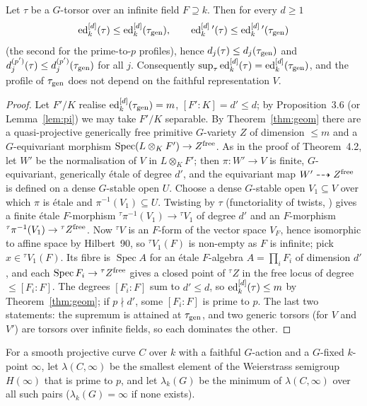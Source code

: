 \begin{proposition}\label{prop:vers}
Let $\tau$ be a $G$-torsor over an infinite field $F\supseteq k$. Then for every $d\ge1$
\[
\operatorname{ed}^{[d]}_k(\tau)\le\operatorname{ed}^{[d]}_k(\tau_{\mathrm{gen}}),\qquad
\operatorname{ed}^{[d]}_k{}'(\tau)\le\operatorname{ed}^{[d]}_k{}'(\tau_{\mathrm{gen}})
\]
(the second for the prime-to-$p$ profiles), hence $d_j(\tau)\le d_j(\tau_{\mathrm{gen}})$ and
$d_j^{(p')}(\tau)\le d_j^{(p')}(\tau_{\mathrm{gen}})$ for all $j$. Consequently
$\sup_\tau\operatorname{ed}^{[d]}_k(\tau)=\operatorname{ed}^{[d]}_k(\tau_{\mathrm{gen}})$, and the profile of $\tau_{\mathrm{gen}}$ does not
depend on the faithful representation $V$. 
\end{proposition}

\begin{proof}
Let $F'/K$ realise $\operatorname{ed}^{[d]}_k(\tau_{\mathrm{gen}})=m$, $[F':K]=d'\le d$; by Proposition~3.6 (or
Lemma~\ref{lem:pi}) we may take $F'/K$ separable. By Theorem~\ref{thm:geom} there are a
quasi-projective generically free primitive $G$-variety $Z$ of dimension $\le m$ and a
$G$-equivariant morphism $\operatorname{Spec}(L\otimes_KF')\to Z^{\rm free}$. As in the
proof of Theorem~4.2, let $W'$ be the normalisation of $V$ in $L\otimes_KF'$; then
$\pi\colon W'\to V$ is finite, $G$-equivariant, generically \'etale of degree $d'$, and
the equivariant map $W'\dashrightarrow Z^{\rm free}$ is defined on a dense $G$-stable
open $U$. Choose a dense $G$-stable open $V_1\subseteq V$ over which $\pi$ is \'etale and
$\pi^{-1}(V_1)\subseteq U$. Twisting by $\tau$ (functoriality of twists,
\cite[\S3]{DR}) gives a finite \'etale $F$-morphism ${}^\tau\pi^{-1}(V_1)\to{}^\tau V_1$
of degree $d'$ and an $F$-morphism ${}^\tau\pi^{-1}(V_1)\to{}^\tau Z^{\rm free}$. Now
${}^\tau V$ is an $F$-form of the vector space $V_F$, hence isomorphic to affine space by
Hilbert~90, so ${}^\tau V_1(F)$ is non-empty as $F$ is infinite; pick $x\in{}^\tau V_1(F)$.
Its fibre is $\operatorname{Spec}A$ for an \'etale $F$-algebra $A=\prod_iF_i$ of
dimension $d'$, and each $\operatorname{Spec}F_i\to{}^\tau Z^{\rm free}$ gives a closed
point of ${}^\tau Z$ in the free locus of degree $\le[F_i:F]$. The degrees $[F_i:F]$
sum to $d'\le d$, so $\operatorname{ed}^{[d]}_k(\tau)\le m$ by Theorem~\ref{thm:geom}; if $p\nmid d'$,
some $[F_i:F]$ is prime to $p$. The last two statements: the supremum is attained at
$\tau_{\mathrm{gen}}$, and two generic torsors (for $V$ and $V'$) are torsors over infinite
fields, so each dominates the other.
\end{proof}

\begin{definition}
For a smooth projective curve $C$ over $k$ with a faithful $G$-action and a $G$-fixed
$k$-point $\infty$, let $\lambda(C,\infty)$ be the smallest element of the Weierstrass
semigroup $H(\infty)$ that is prime to $p$, and let $\lambda_k(G)$ be the minimum of
$\lambda(C,\infty)$ over all such pairs ($\lambda_k(G)=\infty$ if none exists).
\end{definition}

